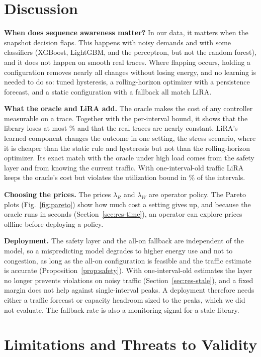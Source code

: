 \documentclass[journal]{IEEEtran}
\begin{document}
\section{Discussion}\label{sec:discussion}

\textbf{When does sequence awareness matter?} In our data, it matters when the snapshot decision flaps. This happens with noisy demands and with some classifiers (XGBoost, LightGBM, and the perceptron, but not the random forest), and it does not happen on smooth real traces. Where flapping occurs, holding a configuration removes nearly all changes without losing energy, and no learning is needed to do so: tuned hysteresis, a rolling-horizon optimizer with a persistence forecast, and a static configuration with a fallback all match LiRA.

\textbf{What the oracle and LiRA add.} The oracle makes the cost of any controller measurable on a trace. Together with the per-interval bound, it shows that the library loses at most \boundMaxLoss\% and that the real traces are nearly constant. LiRA's learned component changes the outcome in one setting, the stress scenario, where it is cheaper than the static rule and hysteresis but not than the rolling-horizon optimizer. Its exact match with the oracle under high load comes from the safety layer and from knowing the current traffic. With one-interval-old traffic LiRA keeps the oracle's cost but violates the utilization bound in \staleLiRAViolhl\% of the intervals.

\textbf{Choosing the prices.} The prices $\lambda_R$ and $\lambda_W$ are operator policy. The Pareto plots (Fig.~\ref{fig:pareto}) show how much cost a setting gives up, and because the oracle runs in seconds (Section~\ref{sec:res-time}), an operator can explore prices offline before deploying a policy.

\textbf{Deployment.} The safety layer and the all-on fallback are independent of the model, so a mispredicting model degrades to higher energy use and not to congestion, as long as the all-on configuration is feasible and the traffic estimate is accurate (Proposition~\ref{prop:safety}). With one-interval-old estimates the layer no longer prevents violations on noisy traffic (Section~\ref{sec:res-stale}), and a fixed margin does not help against single-interval peaks. A deployment therefore needs either a traffic forecast or capacity headroom sized to the peaks, which we did not evaluate. The fallback rate is also a monitoring signal for a stale library.

\section{Limitations and Threats to Validity}\label{sec:limitations}
\end{document}
